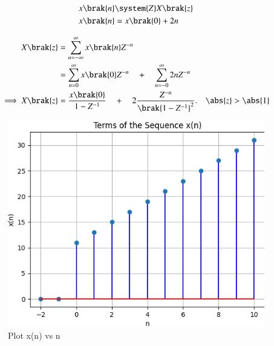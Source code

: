 \documentclass[journal,12pt,twocolumn]{IEEEtran}
\theoremstyle{remark}
\begin{document}
\begin{align}
	x \brak{n} &\system{Z} X \brak{z}\\
	x\brak{n}&=x\brak{0}+2n
\end{align}


\begin{align}
X\brak{z}&= \sum_{n=-\infty}^{\infty} x\brak{n}Z^{-n} \\
&=\sum_{n=0}^{\infty} x\brak{0}Z^{-n}\quad +\quad \sum_{n=-0}^{\infty}2nZ^{-n}\\
\implies X\brak{z}&=\frac{x\brak{0}}{1-Z^{-1}}\quad+\quad 2\frac{Z^{-n}}{\brak{1-Z^{-1}}^{2}}.\quad \abs{z} > \abs{1}
\end{align}

\newpage

\begin{figure}
    
    \includegraphics[width=\columnwidth]{figs/fig.png}
    \caption{Plot x(n) vs n}
    \label{fig:enter-label}
\end{figure}
\end{document}
